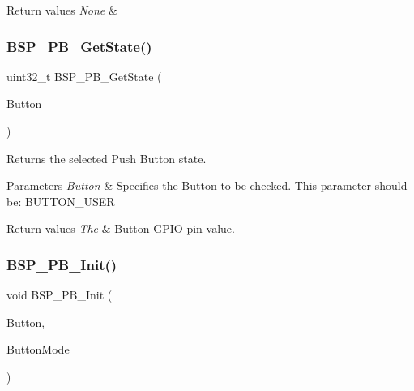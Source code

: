\begin{DoxyRetVals}{Return values}
{\em None} & \\
\hline
\end{DoxyRetVals}
\mbox{\label{group__STM32F3__DISCOVERY__Exported__Functions_gac72e738a85fbbbcf26d038dd5c1a9adc}} 
\subsubsection{\texorpdfstring{B\+S\+P\+\_\+\+P\+B\+\_\+\+Get\+State()}{BSP\_PB\_GetState()}}
{\footnotesize\ttfamily uint32\+\_\+t B\+S\+P\+\_\+\+P\+B\+\_\+\+Get\+State (\begin{DoxyParamCaption}\item[{\hyperlink{stm32f3__discovery_8h_a643816dfbad5c734fc25a29ce8d35bb1}{Button\+\_\+\+Type\+Def}}]{Button }\end{DoxyParamCaption})}



Returns the selected Push Button state. 


\begin{DoxyParams}{Parameters}
{\em Button} & Specifies the Button to be checked. This parameter should be\+: B\+U\+T\+T\+O\+N\+\_\+\+U\+S\+ER \\
\hline
\end{DoxyParams}

\begin{DoxyRetVals}{Return values}
{\em The} & Button \hyperlink{structGPIO}{G\+P\+IO} pin value. \\
\hline
\end{DoxyRetVals}
\mbox{\label{group__STM32F3__DISCOVERY__Exported__Functions_ga540042303b6e13d34b8ef06eb771d1b3}} 
\subsubsection{\texorpdfstring{B\+S\+P\+\_\+\+P\+B\+\_\+\+Init()}{BSP\_PB\_Init()}}
{\footnotesize\ttfamily void B\+S\+P\+\_\+\+P\+B\+\_\+\+Init (\begin{DoxyParamCaption}\item[{\hyperlink{stm32f3__discovery_8h_a643816dfbad5c734fc25a29ce8d35bb1}{Button\+\_\+\+Type\+Def}}]{Button,  }\item[{Button\+Mode\+\_\+\+Type\+Def}]{Button\+Mode }\end{DoxyParamCaption})}




